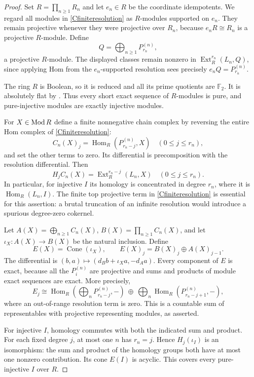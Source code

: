 \begin{proof}
Set $R=\prod_{n\geq1}R_n$ and let $e_n\in R$ be the coordinate idempotents. We regard all modules in \eqref{Cfiniteresolution} as $R$-modules supported on $e_n$. They remain projective whenever they were projective over $R_n$, because $e_nR\cong R_n$ is a projective $R$-module. Define
\[
 Q=\bigoplus_{n\geq1}P^{(n)}_{r_n},
\]
a projective $R$-module. The displayed classes remain nonzero in $\operatorname{Ext}^{r_n}_R(L_n,Q)$, since applying Hom from the $e_n$-supported resolution sees precisely $e_nQ=P^{(n)}_{r_n}$.

The ring $R$ is Boolean, so it is reduced and all its prime quotients are $\mathbb F_2$. It is absolutely flat by \citet[Lemma 15.106.5, tag 092F]{StacksAbsolutelyFlatC}. Thus every short exact sequence of $R$-modules is pure, and pure-injective modules are exactly injective modules.

For $X\in\operatorname{Mod} R$ define a finite nonnegative chain complex by reversing the entire Hom complex of \eqref{Cfiniteresolution}:
\[
 C_n(X)_j=\operatorname{Hom}_R(P^{(n)}_{r_n-j},X)
 \quad(0\leq j\leq r_n),
\]
and set the other terms to zero. Its differential is precomposition with the resolution differential. Then
\[
 H_jC_n(X)=\operatorname{Ext}^{r_n-j}_R(L_n,X)
 \quad(0\leq j\leq r_n).
\]
In particular, for injective $I$ its homology is concentrated in degree $r_n$, where it is $\operatorname{Hom}_R(L_n,I)$. The finite top projective term in \eqref{Cfiniteresolution} is essential for this assertion: a brutal truncation of an infinite resolution would introduce a spurious degree-zero cokernel.

Let $A(X)=\bigoplus_{n\geq1}C_n(X)$, $B(X)=\prod_{n\geq1}C_n(X)$, and let $\iota_X:A(X)\to B(X)$ be the natural inclusion. Define
\[
 E(X)=\operatorname{Cone}(\iota_X),\qquad
 E(X)_j=B(X)_j\oplus A(X)_{j-1}.
\]
The differential is $(b,a)\mapsto(d_Bb+\iota_Xa,-d_Aa)$. Every component of $E$ is exact, because all the $P^{(n)}_i$ are projective and sums and products of module exact sequences are exact. More precisely,
\[
 E_j\cong
 \operatorname{Hom}_R\!\left(\bigoplus_nP^{(n)}_{r_n-j},-\right)
 \ \oplus\ \bigoplus_n
 \operatorname{Hom}_R(P^{(n)}_{r_n-j+1},-),
\]
where an out-of-range resolution term is zero. This is a countable sum of representables with projective representing modules, as asserted.

For injective $I$, homology commutes with both the indicated sum and product. For each fixed degree $j$, at most one $n$ has $r_n=j$. Hence $H_j(\iota_I)$ is an isomorphism: the sum and product of the homology groups both have at most one nonzero contribution. Its cone $E(I)$ is acyclic. This covers every pure-injective $I$ over $R$.


\end{proof}
